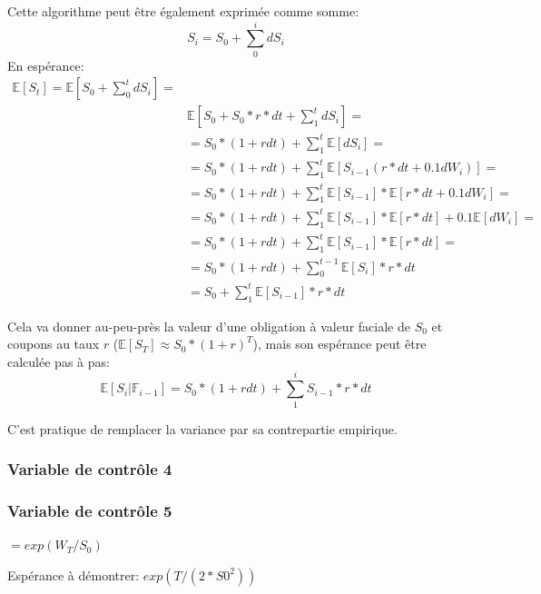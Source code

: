 \documentclass[a4paper,12pt]{scrartcl}
\begin{document}
Cette algorithme peut être également exprimée comme somme:
$$S_i = S_0 + \sum_0^i dS_i$$
En espérance:
\begin{align*}
\mathbb{E}[S_t] = 
\mathbb{E}[S_0 + \sum_0^t dS_i] =  \\
&\mathbb{E}[S_0 + S_0*r*dt +\sum_1^t dS_i] = \\ 
&= S_0*(1+rdt) + \sum_1^t \mathbb{E}[dS_i] = \\
&= S_0*(1+rdt) + \sum_1^t \mathbb{E}[S_{i-1}(r*dt + 0.1dW_{i})] = \\
&= S_0*(1+rdt) + \sum_1^t \mathbb{E}[S_{i-1}]*\mathbb{E}[r*dt + 0.1dW_{i}] = \\
&= S_0*(1+rdt) + \sum_1^t \mathbb{E}[S_{i-1}]*\mathbb{E}[r*dt] + 
                 0.1\mathbb{E}[dW_{i}] = \\
&= S_0*(1+rdt) + \sum_1^t \mathbb{E}[S_{i-1}]*\mathbb{E}[r*dt] = \\
&= S_0*(1+rdt) + \sum_0^{t-1} \mathbb{E}[S_{i}]*r*dt \\
&= S_0 + \sum_1^t \mathbb{E}[S_{i-1}]*r*dt
\end{align*}

Cela va donner au-peu-près la valeur d'une obligation à valeur faciale de $S_0$ et coupons au taux $r$ 
($\mathbb{E}[S_{T}] \approx S_0*(1+r)^T$), 
mais son espérance peut être calculée pas à pas:
$$\mathbb{E}[S_i | \mathbb{F}_{i-1}] = S_0*(1+rdt) + \sum_1^i S_{i-1}*r*dt $$

C'est pratique de remplacer la variance par sa contrepartie empirique. 

\subsubsection{Variable de contrôle 4}



\subsubsection{Variable de contrôle 5}

$=exp(W_T/S_0)$

Espérance à démontrer:
$exp(T/(2*S0^2))$



\clearpage

\appendix
\appendixpage
\addappheadtotoc
\end{document}
